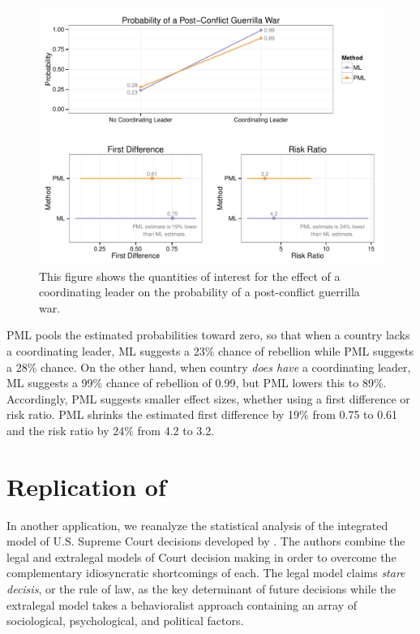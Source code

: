\documentclass[12pt]{article}
\begin{document}
\begin{figure}[H]
\begin{center}
\includegraphics[width = \textwidth]{figs/weisiger-qis.pdf}
\caption{This figure shows the quantities of interest for the effect of a coordinating leader on the probability of a post-conflict guerrilla war.}\label{fig:weisiger-qis}
\end{center}
\end{figure}

PML pools the estimated probabilities toward zero, so that when a country lacks a coordinating leader, ML suggests a 23\% chance of rebellion while PML suggests a 28\% chance. 
On the other hand, when country \textit{does have} a coordinating leader, ML suggests a 99\% chance of rebellion of 0.99, but PML lowers this to 89\%. 
Accordingly, PML suggests smaller effect sizes, whether using a first difference or risk ratio. 
PML shrinks the estimated first difference by 19\% from 0.75 to 0.61 and the risk ratio by 24\% from 4.2 to 3.2.

\section*{Replication of \cite{GeorgeEpstein1992}}

In another application, we reanalyze the statistical analysis of the integrated model of U.S. Supreme Court decisions developed by \cite{GeorgeEpstein1992}. 
The authors combine the legal and extralegal models of Court decision making in order to overcome the complementary idiosyncratic shortcomings of each. 
The legal model claims \emph{stare decisis}, or the rule of law, as the key determinant of future decisions while the extralegal model takes a behavioralist approach containing an array of sociological, psychological, and political factors. 
\end{document}
